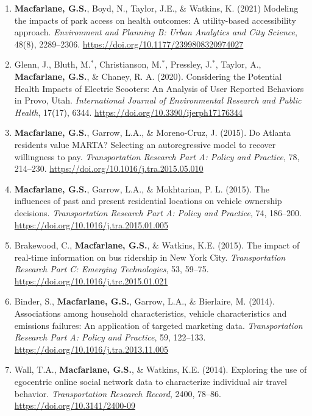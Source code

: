 \documentclass[margin,line]{res}
\newif\ifdetail
\newcounter{enuminitialize}
\newenvironment{myenum}[1][]
{%
 \setcounter{enuminitialize}{#1}
 \addtocounter{enuminitialize}{2}
 \begin{enumerate}[left= 4pt, itemsep=12pt, start=\value{enuminitialize}, label=\arabic*\addtocounter{enumi}{-2}]
}
{%
 \end{enumerate}
}
\begin{document}
\begin{resume}
\begin{myenum}[13]
  \item\textbf{Macfarlane, G.S.}, Boyd, N., Taylor, J.E., \& Watkins, K. (2021) Modeling the impacts of park access
on health outcomes: A utility-based accessibility approach. \textit{ Environment and
Planning B: Urban Analytics and City Science}, 48(8), 2289–2306. \url{https://doi.org/10.1177/2399808320974027}

  \item Glenn, J., Bluth, M.$^*$, Christianson, M.$^*$, Pressley, J.$^*$, Taylor, A.,
\textbf{Macfarlane, G.S.}, \& Chaney, R. A. (2020). Considering the Potential Health
Impacts of Electric Scooters: An Analysis of User Reported Behaviors in Provo,
Utah. \textit{ International Journal of Environmental Research and Public Health},
17(17), 6344. \url{https://doi.org/10.3390/ijerph17176344} \ifdetail Citations: 5  \fi

  \item\textbf{Macfarlane, G.S.}, Garrow, L.A., \& Moreno-Cruz, J. (2015). Do Atlanta
residents value MARTA? Selecting an autoregressive model to recover willingness
to pay. \textit{ Transportation Research Part A: Policy and Practice}, 78, 214–230.
\url{https://doi.org/10.1016/j.tra.2015.05.010} \ifdetail Citations: 8 \fi

  \item\textbf{Macfarlane, G.S.}, Garrow, L.A., \& Mokhtarian, P. L. (2015). The influences of
past and present residential locations on vehicle ownership decisions.
\textit{ Transportation Research Part A: Policy and Practice}, 74, 186–200.
\url{https://doi.org/10.1016/j.tra.2015.01.005} \ifdetail Citations: 40  \fi

  \item Brakewood, C., \textbf{Macfarlane, G.S.}, \& Watkins, K.E. (2015). The impact of
real-time information on bus ridership in New York City. \textit{ Transportation Research
Part C: Emerging Technologies}, 53, 59–75. \url{https://doi.org/10.1016/j.trc.2015.01.021} \ifdetail Citations: 144  \fi

  \item Binder, S., \textbf{Macfarlane, G.S.}, Garrow, L.A., \& Bierlaire, M. (2014).
Associations among household characteristics, vehicle characteristics and
emissions failures: An application of targeted marketing data. \textit{ Transportation
Research Part A: Policy and Practice}, 59, 122–133.
\url{https://doi.org/10.1016/j.tra.2013.11.005}\ifdetail Citations: 16  \fi

  \item Wall, T.A., \textbf{Macfarlane, G.S.}, \& Watkins, K.E. (2014). Exploring the use of
egocentric online social network data to characterize individual air travel
behavior. \textit{ Transportation Research Record}, 2400, 78–86.
\url{https://doi.org/10.3141/2400-09} \ifdetail Citations: 9  \fi


\end{myenum}
\end{resume}
\end{document}
